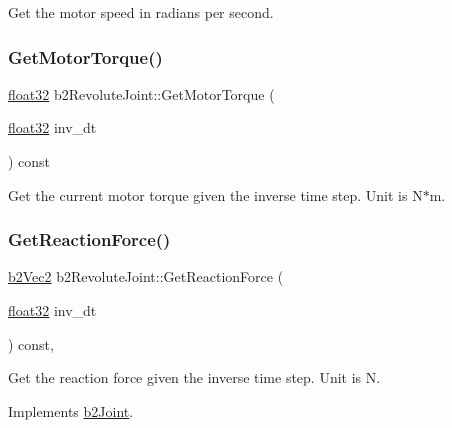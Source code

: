 Get the motor speed in radians per second. 

\mbox{\label{classb2_revolute_joint_a5abafb4d0c1df642f73a5d9faf615e26}} 
\subsubsection{\texorpdfstring{GetMotorTorque()}{GetMotorTorque()}}
{\footnotesize\ttfamily \mbox{\hyperlink{b2_settings_8h_aacdc525d6f7bddb3ae95d5c311bd06a1}{float32}} b2\+Revolute\+Joint\+::\+Get\+Motor\+Torque (\begin{DoxyParamCaption}\item[{\mbox{\hyperlink{b2_settings_8h_aacdc525d6f7bddb3ae95d5c311bd06a1}{float32}}}]{inv\+\_\+dt }\end{DoxyParamCaption}) const}

Get the current motor torque given the inverse time step. Unit is N$\ast$m. \mbox{\label{classb2_revolute_joint_abeb7bf941589aed0d7f330a578a62024}} 
\subsubsection{\texorpdfstring{GetReactionForce()}{GetReactionForce()}}
{\footnotesize\ttfamily \mbox{\hyperlink{structb2_vec2}{b2\+Vec2}} b2\+Revolute\+Joint\+::\+Get\+Reaction\+Force (\begin{DoxyParamCaption}\item[{\mbox{\hyperlink{b2_settings_8h_aacdc525d6f7bddb3ae95d5c311bd06a1}{float32}}}]{inv\+\_\+dt }\end{DoxyParamCaption}) const\hspace{0.3cm}{\ttfamily [override]}, {\ttfamily [virtual]}}

Get the reaction force given the inverse time step. Unit is N. 

Implements \mbox{\hyperlink{classb2_joint_a7e0eddefb9b69ad050b8ef6425838a74}{b2\+Joint}}.

\mbox{\label{classb2_revolute_joint_aab61a3f330aa93ae28f657e36bc3db51}} 
